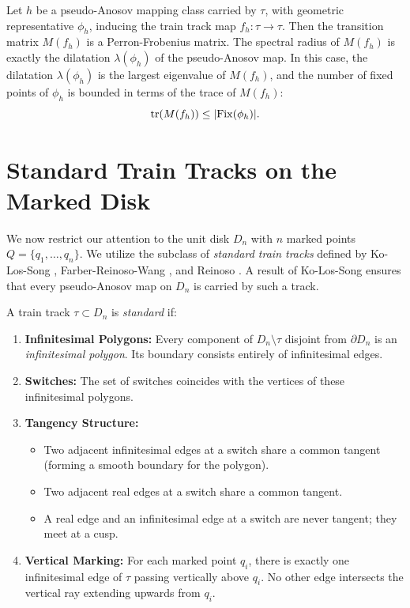 \begin{theorem}\label{thm:perron}
    Let $h$ be a pseudo-Anosov mapping class carried by $\tau$, with geometric representative $\phi_h$, inducing the train track map $f_h: \tau \to \tau$. Then the transition matrix $M(f_h)$ is a Perron-Frobenius matrix. The spectral radius of $M(f_h)$ is exactly the dilatation $\lambda(\phi_h)$ of the pseudo-Anosov map. In this case, the dilatation $\lambda (\phi_h )$ is the largest eigenvalue of $M(f_h)$, and the number of fixed points of $\phi_h$ is bounded in terms of the trace of $M(f_h)$:
    \[
    \mathrm{tr}(M(f_h)) \leq \abs{\mathrm{Fix}(\phi_h)}.
    \]
\end{theorem}

\section{Standard Train Tracks on the Marked Disk}
\label{sec:standard_tracks}

We now restrict our attention to the unit disk $D_n$ with $n$ marked points $Q = \{q_1, \dots, q_n\}$. We utilize the subclass of \emph{standard train tracks} defined by Ko-Los-Song \cite{SongEntropy}, Farber-Reinoso-Wang \cite{farber2024fixed}, and Reinoso \cite{reinoso2024pseudo}. A result of Ko-Los-Song ensures that every pseudo-Anosov map on $D_n$ is carried by such a track.

\begin{definition}\label{def:standard_track}
    A train track $\tau \subset D_n$ is \textit{standard} if:
    \begin{enumerate}
        \item \textbf{Infinitesimal Polygons:} Every component of $D_n \setminus \tau$ disjoint from $\partial D_n$ is an \textit{infinitesimal polygon}. Its boundary consists entirely of infinitesimal edges.
        \item \textbf{Switches:} The set of switches coincides with the vertices of these infinitesimal polygons.
        \item \textbf{Tangency Structure:}
        \begin{itemize}
            \item Two adjacent infinitesimal edges at a switch share a common tangent (forming a smooth boundary for the polygon).
            \item Two adjacent real edges at a switch share a common tangent.
            \item A real edge and an infinitesimal edge at a switch are never tangent; they meet at a cusp.
        \end{itemize}
        \item \textbf{Vertical Marking:} For each marked point $q_i$, there is exactly one infinitesimal edge of $\tau$ passing vertically above $q_i$. No other edge intersects the vertical ray extending upwards from $q_i$.
    \end{enumerate}
\end{definition}

